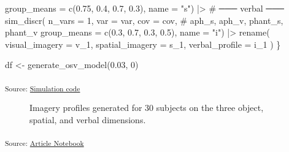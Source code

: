 \documentclass[
  authoryear]{elsarticle}
\newenvironment{Shaded}{\begin{snugshade}}{\end{snugshade}}
\newcommand{\CommentTok}[1]{\textcolor[rgb]{0.37,0.37,0.37}{#1}}
\newcommand{\DecValTok}[1]{\textcolor[rgb]{0.68,0.00,0.00}{#1}}
\newcommand{\FloatTok}[1]{\textcolor[rgb]{0.68,0.00,0.00}{#1}}
\newcommand{\NormalTok}[1]{\textcolor[rgb]{0.00,0.23,0.31}{#1}}
\newcommand{\OperatorTok}[1]{\textcolor[rgb]{0.37,0.37,0.37}{#1}}
\newcommand{\StringTok}[1]{\textcolor[rgb]{0.13,0.47,0.30}{#1}}
\begin{document}
\begin{Shaded}
\begin{Highlighting}[]
\NormalTok{      group\_means }\OperatorTok{=}\NormalTok{ c(}\FloatTok{0.75}\NormalTok{, }\FloatTok{0.4}\NormalTok{, }\FloatTok{0.7}\NormalTok{, }\FloatTok{0.3}\NormalTok{), }
\NormalTok{      name }\OperatorTok{=} \StringTok{"s"}\NormalTok{) }\OperatorTok{|\textgreater{}}
    \CommentTok{\# ─── verbal ───}
\NormalTok{    sim\_discr(}
\NormalTok{      n\_vars }\OperatorTok{=} \DecValTok{1}\NormalTok{,  }
\NormalTok{      var }\OperatorTok{=}\NormalTok{ var, }
\NormalTok{      cov }\OperatorTok{=}\NormalTok{ cov, }
      \CommentTok{\# aph\_s, aph\_v, phant\_s, phant\_v}
\NormalTok{      group\_means }\OperatorTok{=}\NormalTok{ c(}\FloatTok{0.3}\NormalTok{, }\FloatTok{0.7}\NormalTok{, }\FloatTok{0.3}\NormalTok{, }\FloatTok{0.5}\NormalTok{), }
\NormalTok{      name }\OperatorTok{=} \StringTok{"i"}\NormalTok{) }\OperatorTok{|\textgreater{}}
\NormalTok{    rename(}
\NormalTok{      visual\_imagery  }\OperatorTok{=}\NormalTok{ v\_1,}
\NormalTok{      spatial\_imagery }\OperatorTok{=}\NormalTok{ s\_1,}
\NormalTok{      verbal\_profile  }\OperatorTok{=}\NormalTok{ i\_1}
\NormalTok{      )}
\NormalTok{\}}

\NormalTok{df }\OperatorTok{\textless{}{-}}\NormalTok{ generate\_osv\_model(}\FloatTok{0.03}\NormalTok{, }\DecValTok{0}\NormalTok{)}
\end{Highlighting}
\end{Shaded}

\textsubscript{Source:
\href{https://m-delem.github.io/2499-similarity-manuscript/notebooks/simulation-code-preview.html\#cell-osv-model}{Simulation
code}}

\label{cell-fig-plot-osv-model}
\begin{figure}[H]


\caption{\label{fig-plot-osv-model}Imagery profiles generated for 30
subjects on the three object, spatial, and verbal dimensions.}

\end{figure}%

\textsubscript{Source:
\href{https://m-delem.github.io/2499-similarity-manuscript/index.qmd.html}{Article
Notebook}}


  
\end{document}
